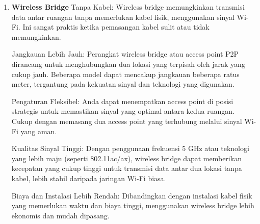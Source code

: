 \begin{enumerate}
    \item 
    \textbf{Wireless Bridge}
    Tanpa Kabel: Wireless bridge memungkinkan transmisi data antar ruangan tanpa memerlukan kabel fisik, menggunakan sinyal Wi-Fi. Ini sangat praktis ketika pemasangan kabel sulit atau tidak memungkinkan.

    Jangkauan Lebih Jauh: Perangkat wireless bridge atau access point P2P dirancang untuk menghubungkan dua lokasi yang terpisah oleh jarak yang cukup jauh. Beberapa model dapat mencakup jangkauan beberapa ratus meter, tergantung pada kekuatan sinyal dan teknologi yang digunakan.

    Pengaturan Fleksibel: Anda dapat menempatkan access point di posisi strategis untuk memastikan sinyal yang optimal antara kedua ruangan. Cukup dengan memasang dua access point yang terhubung melalui sinyal Wi-Fi yang aman.

    Kualitas Sinyal Tinggi: Dengan penggunaan frekuensi 5 GHz atau teknologi yang lebih maju (seperti 802.11ac/ax), wireless bridge dapat memberikan kecepatan yang cukup tinggi untuk transmisi data antar dua lokasi tanpa kabel, lebih stabil daripada jaringan Wi-Fi biasa.

    Biaya dan Instalasi Lebih Rendah: Dibandingkan dengan instalasi kabel fisik yang memerlukan waktu dan biaya tinggi, menggunakan wireless bridge lebih ekonomis dan mudah dipasang.
\end{enumerate}
